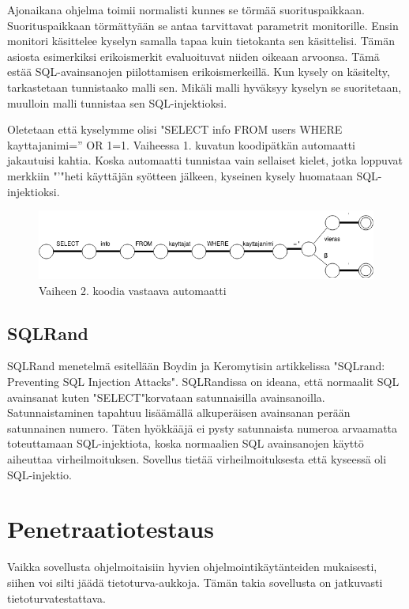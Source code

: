 \documentclass[finnish]{tktltiki2}
\theoremstyle{definition}
\theoremstyle{remark}
\begin{document}
\begin{enumerate}
		Ajonaikana ohjelma toimii normalisti kunnes se törmää suorituspaikkaan. Suorituspaikkaan törmättyään se antaa tarvittavat parametrit monitorille. Ensin monitori käsittelee kyselyn samalla tapaa kuin tietokanta sen käsittelisi. Tämän asiosta esimerkiksi erikoismerkit evaluoituvat niiden oikeaan arvoonsa. Tämä estää SQL-avainsanojen piilottamisen erikoismerkeillä. Kun kysely on käsitelty, tarkastetaan tunnistaako malli sen. Mikäli malli hyväksyy kyselyn se suoritetaan, muulloin malli tunnistaa sen SQL-injektioksi.
		
		Oletetaan että kyselymme olisi "SELECT info FROM users WHERE kayttajanimi='' OR 1=1. Vaiheessa 1. kuvatun koodipätkän automaatti jakautuisi kahtia. Koska automaatti tunnistaa vain sellaiset kielet, jotka loppuvat merkkiin "\space'\space"\space heti käyttäjän syötteen jälkeen, kyseinen kysely huomataan SQL-injektioksi.
			\end{enumerate}
		\begin{figure}[h!]
		\caption{Vaiheen 2. koodia vastaava automaatti}
		\includegraphics[scale=0.5]{kandi}
		\end{figure}
		
	\subsection{SQLRand}
	SQLRand menetelmä esitellään Boydin ja Keromytisin artikkelissa "SQLrand: Preventing SQL Injection Attacks"\cite{sqlrand}. SQLRandissa on ideana, että normaalit SQL avainsanat kuten "SELECT"\space korvataan satunnaisilla avainsanoilla. Satunnaistaminen tapahtuu lisäämällä alkuperäisen avainsanan perään satunnainen numero. Täten hyökkääjä ei pysty satunnaista numeroa arvaamatta toteuttamaan SQL-injektiota, koska normaalien SQL avainsanojen käyttö aiheuttaa virheilmoituksen. Sovellus tietää virheilmoituksesta että kyseessä oli SQL-injektio.
	\section{Penetraatiotestaus}
	
	 Vaikka sovellusta ohjelmoitaisiin hyvien ohjelmointikäytänteiden mukaisesti, siihen voi silti jäädä tietoturva-aukkoja. Tämän takia sovellusta on jatkuvasti tietoturvatestattava. 
	 
\end{document}
